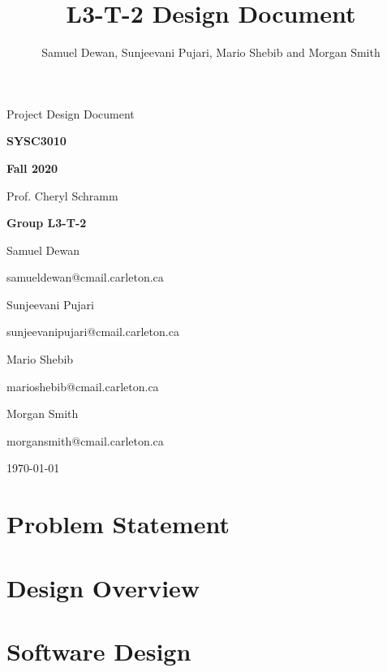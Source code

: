 \documentclass[11pt,letterpaper]{article}
\title{L3-T-2 Design Document}
\author{Samuel Dewan, Sunjeevani Pujari, Mario Shebib and Morgan Smith}
\let\Oldsection\section
\renewcommand{\section}{\FloatBarrier\Oldsection}
\begin{document}
\frenchspacing

\begin{titlepage}
\centering


{\Huge \sffamily Project Design Document}

{\large \textbf{SYSC3010}}

{\large \textbf{Fall 2020}}

Prof. Cheryl Schramm


{\large \textbf{Group L3-T-2}}

Samuel Dewan

{\footnotesize samueldewan@cmail.carleton.ca}

Sunjeevani Pujari

{\footnotesize sunjeevanipujari@cmail.carleton.ca}

Mario Shebib

{\footnotesize marioshebib@cmail.carleton.ca}

Morgan Smith

{\footnotesize morgansmith@cmail.carleton.ca}


{\large \today}


\end{titlepage}

\tableofcontents
\clearpage
{}

\section{Problem Statement}
\label{sec:problem-statement}

\clearpage

\section{Design Overview}
\label{sec:design-overview}

\clearpage

\section{Software Design}
\label{sec:software-design}

\clearpage
\end{document}
